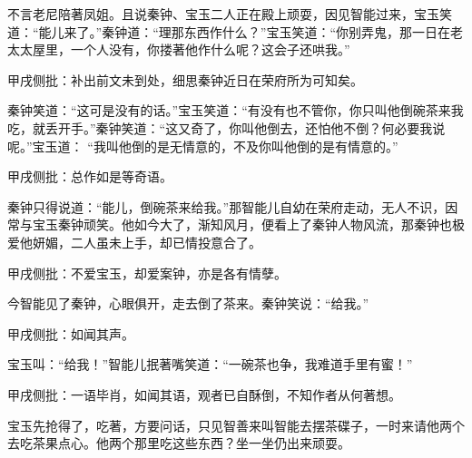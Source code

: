 \begin{parag}


    不言老尼陪著凤姐。且说秦钟、宝玉二人正在殿上顽耍，因见智能过来，宝玉笑道：“能儿来了。”秦钟道：“理那东西作什么？”宝玉笑道：“你别弄鬼，那一日在老太太屋里，一个人没有，你搂著他作什么呢？这会子还哄我。”\begin{note}甲戌侧批：补出前文未到处，细思秦钟近日在荣府所为可知矣。\end{note}秦钟笑道：“这可是没有的话。”宝玉笑道：“有没有也不管你，你只叫他倒碗茶来我吃，就丢开手。”秦钟笑道：“这又奇了，你叫他倒去，还怕他不倒？何必要我说呢。”宝玉道： “我叫他倒的是无情意的，不及你叫他倒的是有情意的。”\begin{note}甲戌侧批：总作如是等奇语。\end{note}秦钟只得说道：“能儿，倒碗茶来给我。”那智能儿自幼在荣府走动，无人不识，因常与宝玉秦钟顽笑。他如今大了，渐知风月，便看上了秦钟人物风流，那秦钟也极爱他妍媚，二人虽未上手，却已情投意合了。\begin{note}甲戌侧批：不爱宝玉，却爱案钟，亦是各有情孽。\end{note}今智能见了秦钟，心眼俱开，走去倒了茶来。秦钟笑说：“给我。”\begin{note}甲戌侧批：如闻其声。\end{note}宝玉叫：“给我！”智能儿抿著嘴笑道：“一碗茶也争，我难道手里有蜜！”\begin{note}甲戌侧批：一语毕肖，如闻其语，观者已自酥倒，不知作者从何著想。\end{note}宝玉先抢得了，吃著，方要问话，只见智善来叫智能去摆茶碟子，一时来请他两个去吃茶果点心。他两个那里吃这些东西？坐一坐仍出来顽耍。
\end{parag}


